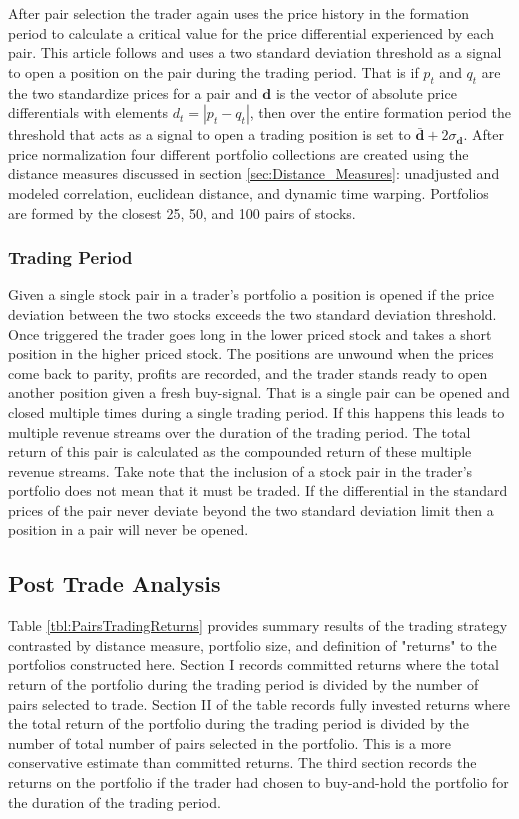 \documentclass[12pt]{article}
\begin{document}
After pair selection the trader again uses the price history in the formation period to calculate a critical value for the price differential experienced by each pair. This article follows \cite{Gatev_et_al_2006} and uses a two standard deviation threshold as a signal to open a position on the pair during the trading period. That is if $p_{t}$ and $q_{t}$ are the two standardize prices for a pair and $\boldsymbol{d}$ is the vector of absolute price differentials with elements $d_{t} = |p_{t} - q_{t}|$, then over the entire formation period the threshold that acts as a signal to open a trading position is set to $\boldsymbol{\bar{d}} + 2 \sigma_{\boldsymbol{d}}$. After price normalization four different portfolio collections are created using the distance measures discussed in section \ref{sec:Distance_Measures}: unadjusted and modeled correlation, euclidean distance, and dynamic time warping. Portfolios are formed by the closest 25, 50, and 100 pairs of stocks.


\subsubsection{Trading Period}

Given a single stock pair in a trader's portfolio a position is opened if the price deviation between the two stocks exceeds the two standard deviation threshold. Once triggered the trader goes long in the lower priced stock and takes a short position in the higher priced stock. The positions are unwound when the prices come back to parity, profits are recorded, and the trader stands ready to open another position given a fresh buy-signal. That is a single pair can be opened and closed multiple times during a single trading period. If this happens this leads to multiple revenue streams over the duration of the trading period. The total return of this pair is calculated as the compounded return of these multiple revenue streams. Take note that the inclusion of a stock pair in the trader's portfolio does not mean that it must be traded. If the differential in the standard prices of the pair never deviate beyond the two standard deviation limit then a position in a pair will never be opened.

\subsection{Post Trade Analysis}

Table \ref{tbl:PairsTradingReturns} provides summary results of the trading strategy contrasted by distance measure, portfolio size, and definition of "returns" to the portfolios constructed here. Section I records committed returns where the total return of the portfolio during the trading period is divided by the number of pairs selected to trade. Section II of the table records fully invested returns where the total return of the portfolio during the trading period is divided by the number of total number of pairs selected in the portfolio. This is a more conservative estimate than committed returns. The third section records the returns on the portfolio if the trader had chosen to buy-and-hold the portfolio for the duration of the trading period.
\end{document}
